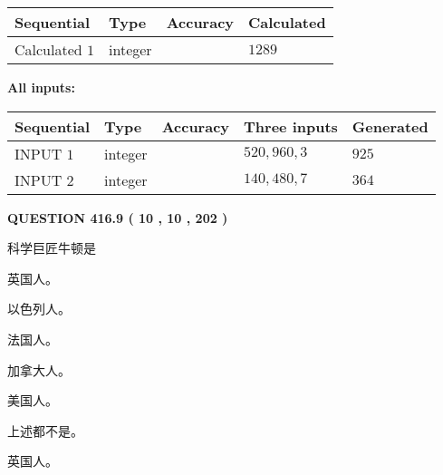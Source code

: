 \documentclass{ctexart}
\begin{document}
   
\noindent{}
   
   
  
  
\noindent\begin{tabular}{|l|l|l|l|}
\hline
 Sequential & Type & Accuracy & Calculated \\ 
\hline
 
 
  Calculated $  1 $ & integer &  & 
  $ 1289 $ 
 \\  \hline  
 \end{tabular}
   
   
   
   
\noindent\vspace{0.1in}\hspace{-0.08in} {\textbf{\Large{All inputs: }}}
   
   
  
  
\noindent\begin{tabular}{|l|l|l|l|l|}
\hline
 Sequential & Type & Accuracy & Three inputs & Generated \\ 
\hline
 
 
  INPUT $  1 $ & integer &  & $
 520
 , 
 960
 , 
 3
 $ & $ 925 $ 
 \\  \hline  
 
 
  INPUT $  2 $ & integer &  & $
 140
 , 
 480
 , 
 7
 $ & $ 364 $ 
 \\  \hline  
 \end{tabular}
   
   
  
\vspace{0.2in}
  
{\textbf{\Large{QUESTION
416.9 
 ( 10 , 10 , 202 )
}}}
  
  
科学巨匠牛顿是
 
 
英国人。
 
 
以色列人。
 
 
法国人。
 
 
加拿大人。
 
 
美国人。
 
 
 上述都不是。
 
 
\noindent{}
 
 
英国人。
 
 
\noindent{}
 
\end{document}
